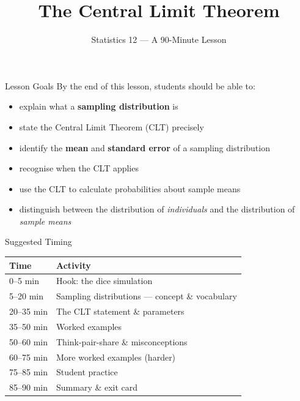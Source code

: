 \documentclass[aspectratio=169]{beamer}
\title{The Central Limit Theorem}
\subtitle{Statistics 12 --- A 90-Minute Lesson}
\author{}
\date{}
\begin{document}
\begin{frame}
    \titlepage
\end{frame}

\begin{frame}{Lesson Goals}
    By the end of this lesson, students should be able to:
    \begin{itemize}
        \item explain what a \textbf{sampling distribution} is
        \item state the Central Limit Theorem (CLT) precisely
        \item identify the \textbf{mean} and \textbf{standard error} of a sampling distribution
        \item recognise when the CLT applies
        \item use the CLT to calculate probabilities about sample means
        \item distinguish between the distribution of \emph{individuals} and the
              distribution of \emph{sample means}
    \end{itemize}
\end{frame}

\begin{frame}{Suggested Timing}
    \begin{center}
        \begin{tabular}{@{}ll@{}}
            \toprule
            \textbf{Time} & \textbf{Activity}                                \\
            \midrule
            0--5 min      & Hook: the dice simulation                        \\
            5--20 min     & Sampling distributions --- concept \& vocabulary \\
            20--35 min    & The CLT statement \& parameters                  \\
            35--50 min    & Worked examples                                  \\
            50--60 min    & Think-pair-share \& misconceptions               \\
            60--75 min    & More worked examples (harder)                    \\
            75--85 min    & Student practice                                 \\
            85--90 min    & Summary \& exit card                             \\
            \bottomrule
        \end{tabular}
    \end{center}
\end{frame}
\end{document}
